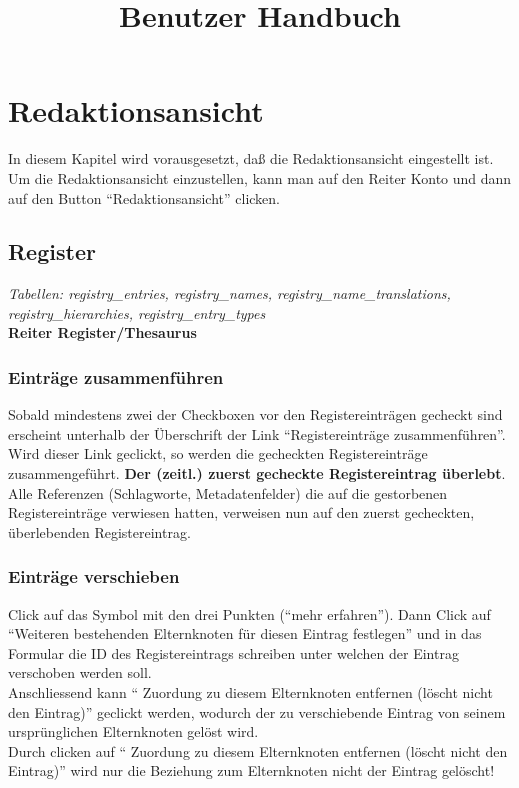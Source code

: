 \documentclass[a4paper,10pt]{article}
\title{Benutzer Handbuch}
\author{}
\date{}
\begin{document}
\maketitle
\tableofcontents
\newpage

\section{Redaktionsansicht}
In diesem Kapitel wird vorausgesetzt, daß die Redaktionsansicht eingestellt ist. Um die Redaktionsansicht einzustellen, kann man auf den Reiter Konto und dann auf den Button ``Redaktionsansicht'' clicken.

\subsection{Register}
\textit{Tabellen: registry\_entries, registry\_names,  registry\_name\_translations, registry\_hierarchies, registry\_entry\_types}\\

\textbf{Reiter Register\slash Thesaurus}\\

\subsubsection{Einträge zusammenführen}
Sobald mindestens zwei der Checkboxen vor den Registereinträgen gecheckt sind erscheint unterhalb der Überschrift der Link ``Registereinträge zusammenführen''. 
Wird dieser Link geclickt, so werden die gecheckten Registereinträge zusammengeführt. \textbf{Der (zeitl.) zuerst gecheckte Registereintrag überlebt}.\\
Alle Referenzen (Schlagworte, Metadatenfelder) die auf die gestorbenen Registereinträge verwiesen hatten, verweisen nun auf den zuerst gecheckten, überlebenden Registereintrag.

\subsubsection{Einträge verschieben}
Click auf das Symbol mit den drei Punkten (``mehr erfahren''). Dann Click auf ``Weiteren bestehenden Elternknoten für diesen Eintrag festlegen'' und in das Formular die ID des Registereintrags schreiben unter welchen der Eintrag verschoben werden soll.\\
Anschliessend kann ``
Zuordung zu diesem Elternknoten entfernen (löscht nicht den Eintrag)'' geclickt werden, wodurch der zu verschiebende Eintrag von seinem ursprünglichen Elternknoten gelöst wird.\\
Durch clicken auf ``
Zuordung zu diesem Elternknoten entfernen (löscht nicht den Eintrag)'' wird nur die Beziehung zum Elternknoten nicht der Eintrag gelöscht!
\end{document}
